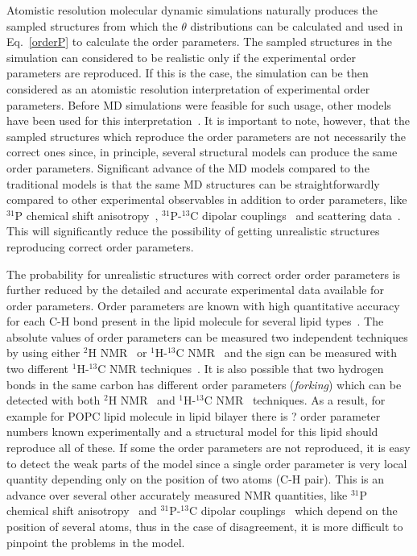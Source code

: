\documentclass[aps,prl,superscriptaddress,twocolumn]{revtex4}
\begin{document}
Atomistic resolution molecular dynamic simulations naturally produces the
sampled structures from which the $\theta$ distributions can be calculated and
used in Eq.~\ref{orderP} to calculate the order parameters.
The sampled structures in the simulation can considered to be realistic
only if the experimental order parameters are reproduced.
If this is the case, the simulation can be then considered 
as an atomistic resolution interpretation of experimental order parameters.
Before MD simulations were feasible for such usage, other models have been used for this interpretation~\cite{??}.
It is important to note, however, that the sampled structures which reproduce the order parameters are not 
necessarily the correct ones since, in principle, several structural models can produce the same order parameters. 
Significant advance of the MD models compared to the traditional models is that the same MD 
structures can be straightforwardly compared to other experimental observables in addition to order parameters, 
like $^{31}$P chemical shift anisotropy~\cite{chowdhary13}, $^{31}$P-$^{13}$C dipolar couplings~\cite{prakash10}
and scattering data~\cite{??}. This will significantly reduce the 
possibility of getting unrealistic structures reproducing correct order parameters.

The probability for unrealistic structures with correct order order parameters is further reduced by
the detailed and accurate experimental data available for order parameters.
Order parameters are known with high quantitative accuracy for each C-H bond present in the lipid molecule
for several lipid types~\cite{??}. The absolute values of order parameters can be measured two independent
techniques by using either $^2$H NMR~\cite{seelig77c} or $^1$H-$^{13}$C NMR~\cite{hong95a,gross97,dvinskikh05a,ferreira13} and
the sign can be measured with two different $^1$H-$^{13}$C NMR techniques~\cite{hong95a,hong95b,gross97}.
It is also possible that two hydrogen bonds in the same carbon has different order parameters ({\it forking})
which can be detected with both $^2$H NMR~\cite{??} and $^1$H-$^{13}$C NMR~\cite{??} techniques.
As a result, for example for POPC lipid molecule in lipid bilayer there is ? order parameter numbers
known experimentally and a structural model for this lipid should reproduce all of these.
If some the order parameters are not reproduced, it is easy to detect the weak parts of the model
since a single order parameter is very local quantity depending only on the position of two atoms (C-H pair).
This is an advance over several other accurately measured NMR quantities, 
like $^{31}$P chemical shift anisotropy~\cite{chowdhary13} and $^{31}$P-$^{13}$C dipolar couplings~\cite{prakash10}
which depend on the position of several atoms, thus in the case of disagreement, it is more difficult 
to pinpoint the problems in the model.
\end{document}

